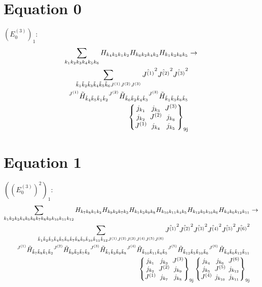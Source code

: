 \documentclass[11pt]{article}
\newcommand{\ninej}[9]{\begingroup\setlength{\arraycolsep}{0.2em}\begin{Bmatrix} #1 & #2 & #3 \\ #4 & #5 & #6 \\ #7 & #8 & #9 \end{Bmatrix}_{\text{9j}}\endgroup}
\begin{document}
\section{Equation 0}
$\left({E^{(3)}_{0}}\right)_{1}$:
\begin{align}
\sum_{{k}_{1}{k}_{2}{k}_{3}{k}_{4}{k}_{5}{k}_{6}}{H}_{{k}_{4}{k}_{5}{k}_{1}{k}_{2}}{H}_{{k}_{6}{k}_{2}{k}_{4}{k}_{3}}{H}_{{k}_{1}{k}_{3}{k}_{6}{k}_{5}}&\rightarrow \notag \\\sum_{\tilde{k}_{1}\tilde{k}_{2}\tilde{k}_{3}\tilde{k}_{4}\tilde{k}_{5}\tilde{k}_{6}J^{(1)}J^{(2)}J^{(3)}}\hat{J^{(1)}}^{2}\hat{J^{(2)}}^{2}\hat{J^{(3)}}^{2}& \notag \\{}^{J^{(1)}}\tilde{H}_{\tilde{k}_{4}\tilde{k}_{5}\tilde{k}_{1}\tilde{k}_{2}}{}^{J^{(2)}}\tilde{H}_{\tilde{k}_{6}\tilde{k}_{2}\tilde{k}_{4}\tilde{k}_{3}}{}^{J^{(3)}}\tilde{H}_{\tilde{k}_{1}\tilde{k}_{3}\tilde{k}_{6}\tilde{k}_{5}}& \notag \\\ninej{j_{{k}_{1}}}{j_{{k}_{3}}}{J^{(3)}}{j_{{k}_{2}}}{J^{(2)}}{j_{{k}_{6}}}{J^{(1)}}{j_{{k}_{4}}}{j_{{k}_{5}}}
\end{align}

\section{Equation 1}
$\left({(E^{(3)}_{0})^{2}}\right)_{1}$:
\begin{align}
\sum_{{k}_{1}{k}_{2}{k}_{3}{k}_{4}{k}_{5}{k}_{6}{k}_{7}{k}_{8}{k}_{9}{k}_{10}{k}_{11}{k}_{12}}{H}_{{k}_{7}{k}_{8}{k}_{1}{k}_{2}}{H}_{{k}_{9}{k}_{2}{k}_{7}{k}_{3}}{H}_{{k}_{1}{k}_{3}{k}_{9}{k}_{8}}{H}_{{k}_{10}{k}_{11}{k}_{4}{k}_{5}}{H}_{{k}_{12}{k}_{5}{k}_{10}{k}_{6}}{H}_{{k}_{4}{k}_{6}{k}_{12}{k}_{11}}&\rightarrow \notag \\\sum_{\tilde{k}_{1}\tilde{k}_{2}\tilde{k}_{3}\tilde{k}_{4}\tilde{k}_{5}\tilde{k}_{6}\tilde{k}_{7}\tilde{k}_{8}\tilde{k}_{9}\tilde{k}_{10}\tilde{k}_{11}\tilde{k}_{12}J^{(1)}J^{(2)}J^{(3)}J^{(4)}J^{(5)}J^{(6)}}\hat{J^{(1)}}^{2}\hat{J^{(2)}}^{2}\hat{J^{(3)}}^{2}\hat{J^{(4)}}^{2}\hat{J^{(5)}}^{2}\hat{J^{(6)}}^{2}& \notag \\{}^{J^{(1)}}\tilde{H}_{\tilde{k}_{7}\tilde{k}_{8}\tilde{k}_{1}\tilde{k}_{2}}{}^{J^{(2)}}\tilde{H}_{\tilde{k}_{9}\tilde{k}_{2}\tilde{k}_{7}\tilde{k}_{3}}{}^{J^{(3)}}\tilde{H}_{\tilde{k}_{1}\tilde{k}_{3}\tilde{k}_{9}\tilde{k}_{8}}{}^{J^{(4)}}\tilde{H}_{\tilde{k}_{10}\tilde{k}_{11}\tilde{k}_{4}\tilde{k}_{5}}{}^{J^{(5)}}\tilde{H}_{\tilde{k}_{12}\tilde{k}_{5}\tilde{k}_{10}\tilde{k}_{6}}{}^{J^{(6)}}\tilde{H}_{\tilde{k}_{4}\tilde{k}_{6}\tilde{k}_{12}\tilde{k}_{11}}& \notag \\\ninej{j_{{k}_{1}}}{j_{{k}_{3}}}{J^{(3)}}{j_{{k}_{2}}}{J^{(2)}}{j_{{k}_{9}}}{J^{(1)}}{j_{{k}_{7}}}{j_{{k}_{8}}}\ninej{j_{{k}_{4}}}{j_{{k}_{6}}}{J^{(6)}}{j_{{k}_{5}}}{J^{(5)}}{j_{{k}_{12}}}{J^{(4)}}{j_{{k}_{10}}}{j_{{k}_{11}}}
\end{align}
\end{document}
